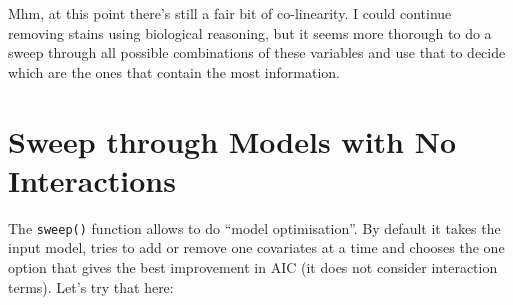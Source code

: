 \documentclass[a4paper]{article}\usepackage[]{graphicx}\usepackage[]{color}
\begin{document}
Mhm, at this point there's still a fair bit of co-linearity. I could continue removing stains using biological reasoning, but it seems more thorough to do a sweep through all possible combinations of these variables and use that to decide which are the ones that contain the most information.

\section{Sweep through Models with No Interactions}
The \texttt{sweep()} function allows to do ``model optimisation''. By default it takes the input model, tries to add or remove one covariates at a time and chooses the one option that gives the best improvement in AIC (it does not consider interaction terms). Let's try that here:
\end{document}
